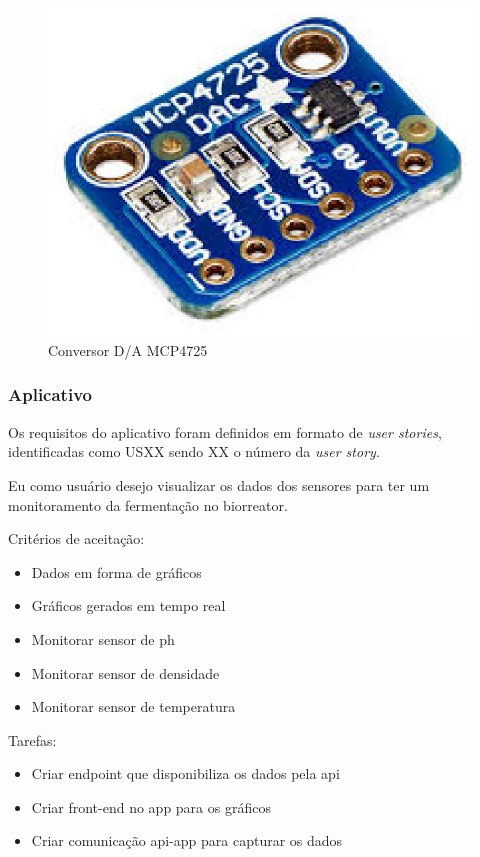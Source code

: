 \begin{figure}[h]
	\centering
	\includegraphics[keepaspectratio=true,scale=0.5]{figuras/sensor4.eps}
	\caption{Conversor D/A MCP4725}
	\label{sensor4}
\end{figure}

\subsubsection{Aplicativo}

Os requisitos do aplicativo foram definidos em formato de \textit{user stories}, identificadas como USXX sendo XX o número da \textit{user story}.


Eu como usuário desejo visualizar os dados dos sensores para ter um monitoramento da fermentação no biorreator.

Critérios de aceitação:
\begin{itemize}
  \item Dados em forma de gráficos
  \item Gráficos gerados em tempo real
  \item Monitorar sensor de ph
  \item Monitorar sensor de densidade
  \item Monitorar sensor de temperatura
\end{itemize}

Tarefas:
\begin{itemize}
  \item Criar endpoint que disponibiliza os dados pela api
  \item Criar front-end no app para os gráficos
  \item Criar comunicação api-app para capturar os dados
\end{itemize}

